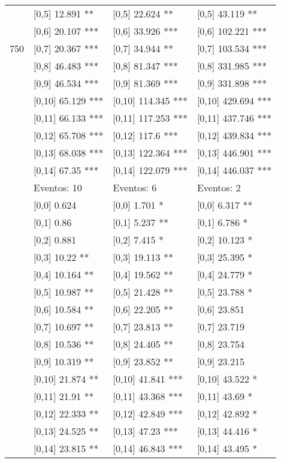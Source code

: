 \begin{table}
\begin{tabular}[t]{llll}
 & {}[0,5] 12.891 ** & {}[0,5] 22.624 ** & {}[0,5] 43.119 **\\
 & {}[0,6] 20.107 *** & {}[0,6] 33.926 *** & {}[0,6] 102.221 ***\\
750 & {}[0,7] 20.367 *** & {}[0,7] 34.944 ** & {}[0,7] 103.534 ***\\
\addlinespace
 & {}[0,8] 46.483 *** & {}[0,8] 81.347 *** & {}[0,8] 331.985 ***\\
 & {}[0,9] 46.534 *** & {}[0,9] 81.369 *** & {}[0,9] 331.898 ***\\
 & {}[0,10] 65.129 *** & {}[0,10] 114.345 *** & {}[0,10] 429.694 ***\\
 & {}[0,11] 66.133 *** & {}[0,11] 117.253 *** & {}[0,11] 437.746 ***\\
 & {}[0,12] 65.708 *** & {}[0,12] 117.6 *** & {}[0,12] 439.834 ***\\
\addlinespace
 & {}[0,13] 68.038 *** & {}[0,13] 122.364 *** & {}[0,13] 446.901 ***\\
 & {}[0,14] 67.35 *** & {}[0,14] 122.079 *** & {}[0,14] 446.037 ***\\
 & Eventos:  10 & Eventos:  6 & Eventos:  2\\
 & {}[0,0] 0.624 & {}[0,0] 1.701 * & {}[0,0] 6.317 **\\
 & {}[0,1] 0.86 & {}[0,1] 5.237 ** & {}[0,1] 6.786 *\\
\addlinespace
 & {}[0,2] 0.881 & {}[0,2] 7.415 * & {}[0,2] 10.123 *\\
 & {}[0,3] 10.22 ** & {}[0,3] 19.113 ** & {}[0,3] 25.395 *\\
 & {}[0,4] 10.164 ** & {}[0,4] 19.562 ** & {}[0,4] 24.779 *\\
 & {}[0,5] 10.987 ** & {}[0,5] 21.428 ** & {}[0,5] 23.788 *\\
 & {}[0,6] 10.584 ** & {}[0,6] 22.205 ** & {}[0,6] 23.851\\
\addlinespace
1000 & {}[0,7] 10.697 ** & {}[0,7] 23.813 ** & {}[0,7] 23.719\\
 & {}[0,8] 10.536 ** & {}[0,8] 24.405 ** & {}[0,8] 23.754\\
 & {}[0,9] 10.319 ** & {}[0,9] 23.852 ** & {}[0,9] 23.215\\
 & {}[0,10] 21.874 ** & {}[0,10] 41.841 *** & {}[0,10] 43.522 *\\
 & {}[0,11] 21.91 ** & {}[0,11] 43.368 *** & {}[0,11] 43.69 *\\
\addlinespace
 & {}[0,12] 22.333 ** & {}[0,12] 42.849 *** & {}[0,12] 42.892 *\\
 & {}[0,13] 24.525 ** & {}[0,13] 47.23 *** & {}[0,13] 44.416 *\\
 & {}[0,14] 23.815 ** & {}[0,14] 46.843 *** & {}[0,14] 43.495 *\\
\bottomrule
\end{tabular}
\end{table}
